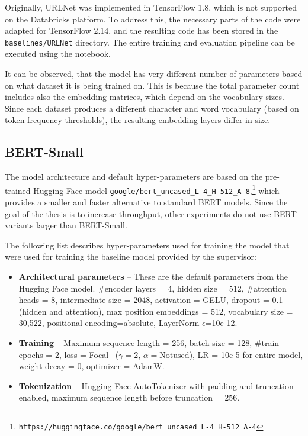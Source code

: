 Originally, URLNet was implemented in TensorFlow 1.8, which is not supported on the Databricks platform. To address this, the necessary parts of the code were adapted for TensorFlow 2.14, and the resulting code has been stored in the \texttt{baselines/URLNet} directory. The entire training and evaluation pipeline can be executed using the  notebook.

It can be observed, that the model has very different number of parameters based on what dataset it is being trained on. This is because the total parameter count includes also the embedding matrices, which depend on the vocabulary sizes. Since each dataset produces a different character and word vocabulary (based on token frequency thresholds), the resulting embedding layers differ in size.

\subsection{BERT-Small}
\label{baseline:bert_small}
The model architecture and default hyper-parameters are based on the pre-trained Hugging Face model \texttt{google/bert\_uncased\_L-4\_H-512\_A-8},\footnote{\nolinkurl{https://huggingface.co/google/bert_uncased_L-4_H-512_A-4}} which provides a smaller and faster alternative to standard BERT models. Since the goal of the thesis is to increase throughput, other experiments do not use BERT variants larger than BERT-Small.

The following list describes hyper-parameters used for training the model that were used for training the baseline model provided by the supervisor:
\begin{itemize}
    \item \textbf{Architectural parameters} -- These are the default parameters from the Hugging Face model. \#encoder layers = 4, hidden size = 512, \#attention heads = 8, intermediate size = 2048, activation = GELU, dropout = 0.1 (hidden and attention), max position embeddings = 512, vocabulary size = 30,522, positional encoding=absolute, LayerNorm $\epsilon$=10e-12.

    \item \textbf{Training} -- Maximum sequence length = 256, batch size = 128, \#train epochs = 2, loss = Focal~\cite{lin2018focallossdenseobject} ($\gamma=2$, $\alpha=\mathrm{Not used}$), LR = 10e-5 for entire model, weight decay = 0, optimizer = AdamW.

    \item \textbf{Tokenization} -- Hugging Face AutoTokenizer with padding and truncation enabled, maximum sequence length before truncation = 256.
\end{itemize}

